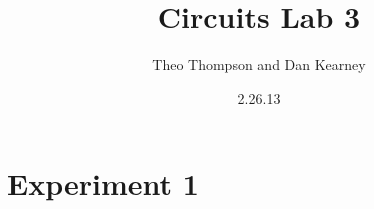 \documentclass{article}
\title{Circuits Lab 3}
\author{Theo Thompson and Dan Kearney}
\date{2.26.13}
\begin{document}
\maketitle

\section*{Experiment 1}
\end{document}
